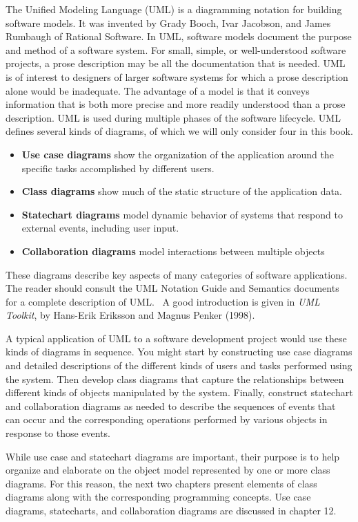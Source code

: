 The Unified Modeling Language (UML) is a diagramming notation
for building software models. It was invented by Grady Booch, Ivar
Jacobson, and James Rumbaugh of Rational Software. In UML, software
models document the purpose and method of a software system. For small,
simple, or well-understood software projects, a prose description may
be all the documentation that is needed. UML is of interest to
designers of larger software systems for which a prose description
alone would be inadequate. The advantage of a model is that it conveys
information that is both more precise and more readily understood than
a prose description. UML is used during multiple phases of the software
lifecycle. UML defines several kinds of diagrams, of which we will only
consider four in this book.

\begin{itemize}
\item \textbf{Use case diagrams} show the organization of the
application around the specific tasks accomplished by different users.
\item \textbf{Class diagrams} show much of the static structure of the
application data.
\item \textbf{Statechart diagrams} model dynamic behavior of systems
that respond to external events, including user input.
\item \textbf{Collaboration diagrams} model interactions between
multiple objects
\end{itemize}
These diagrams describe key aspects of many categories of software
applications. The reader should consult the UML Notation Guide and
Semantics documents for a complete description of UML. \ A good
introduction is given in \textit{UML Toolkit}, by Hans-Erik Eriksson
and Magnus Penker (1998).

A typical application of UML to a software development project would use
these kinds of diagrams in sequence. You might start by constructing
use case diagrams and detailed descriptions of the different kinds of
users and tasks performed using the system. Then develop class diagrams
that capture the relationships between different kinds of objects
manipulated by the system. Finally, construct statechart and
collaboration diagrams as needed to describe the sequences of events
that can occur and the corresponding operations performed by various
objects in response to those events.

While use case and statechart diagrams are important, their purpose is
to help organize and elaborate on the object model represented by one
or more class diagrams. For this reason, the next two chapters present
elements of class diagrams along with the corresponding programming
concepts. Use case diagrams, statecharts, and collaboration diagrams
are discussed in chapter 12.


